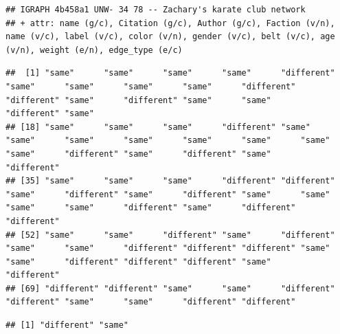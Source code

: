 \documentclass[
]{book}
\newenvironment{Shaded}{\begin{snugshade}}{\end{snugshade}}
\newcommand{\CommentTok}[1]{\textcolor[rgb]{0.56,0.35,0.01}{\textit{#1}}}
\newcommand{\FunctionTok}[1]{\textcolor[rgb]{0.13,0.29,0.53}{\textbf{#1}}}
\newcommand{\NormalTok}[1]{#1}
\newcommand{\SpecialCharTok}[1]{\textcolor[rgb]{0.81,0.36,0.00}{\textbf{#1}}}
\begin{document}
\begin{verbatim}
## IGRAPH 4b458a1 UNW- 34 78 -- Zachary's karate club network
## + attr: name (g/c), Citation (g/c), Author (g/c), Faction (v/n), name (v/c), label (v/c), color (v/n), gender (v/c), belt (v/c), age (v/n), weight (e/n), edge_type (e/c)
\end{verbatim}

\begin{Shaded}
\end{Shaded}

\begin{verbatim}
##  [1] "same"      "same"      "same"      "same"      "different" "same"      "same"      "same"      "same"      "different" "different" "same"      "different" "same"      "same"      "different" "same"     
## [18] "same"      "same"      "same"      "different" "same"      "same"      "same"      "same"      "same"      "same"      "same"      "same"      "different" "same"      "different" "same"      "different"
## [35] "same"      "same"      "same"      "different" "different" "same"      "different" "same"      "different" "same"      "same"      "same"      "same"      "different" "same"      "different" "different"
## [52] "same"      "same"      "different" "same"      "different" "same"      "same"      "different" "different" "different" "same"      "same"      "different" "different" "different" "same"      "different"
## [69] "different" "different" "same"      "same"      "different" "different" "same"      "same"      "different" "different"
\end{verbatim}

\begin{Shaded}
\end{Shaded}

\begin{verbatim}
## [1] "different" "same"
\end{verbatim}
\end{document}
